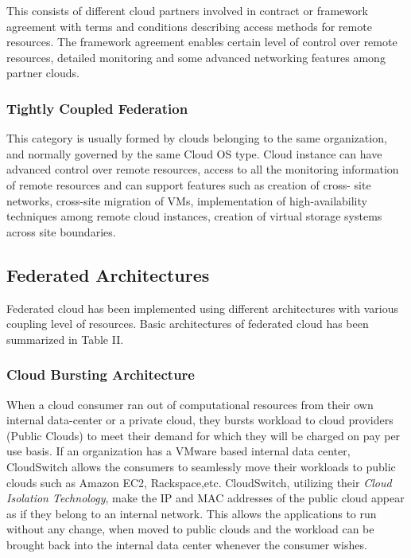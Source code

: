 \documentclass[conference]{IEEEtran}
\begin{document}
This consists of different cloud partners involved in contract or framework agreement with terms and conditions describing access methods for remote resources. The framework agreement enables certain level of control over remote resources, detailed monitoring and some advanced networking features among partner clouds.

\subsubsection{Tightly Coupled Federation}

This category is usually formed by clouds belonging to the same organization, and normally governed by the same Cloud OS type. Cloud instance can have advanced control over remote resources, access to all the monitoring information of remote resources and can support features such as creation of cross- site networks, cross-site migration of VMs, implementation of high-availability techniques among remote cloud instances, creation of virtual storage systems across site boundaries.


\subsection{Federated Architectures}

Federated cloud has been implemented using different architectures with various coupling level of resources. Basic architectures of federated cloud\cite {6165242} has been summarized in Table II.

\subsubsection{Cloud Bursting Architecture}

When a cloud consumer ran out of computational resources from their own internal data-center or a private cloud, they bursts workload to cloud providers (Public Clouds) to meet their demand for which they will be charged on pay per use basis. If an organization has a VMware \cite{vmware} based internal data center, CloudSwitch \cite{cloudswitch} allows the consumers to seamlessly move their workloads to public clouds such as Amazon EC2\cite{amazon}, Rackspace\cite{rackspace},etc. CloudSwitch, utilizing their \textit{Cloud Isolation Technology}, make the IP and MAC addresses of the public cloud appear as if they belong to an internal network. This allows the applications to run without any change, when moved to public clouds and the workload can be brought back into the internal data center whenever the consumer wishes.
\end{document}
